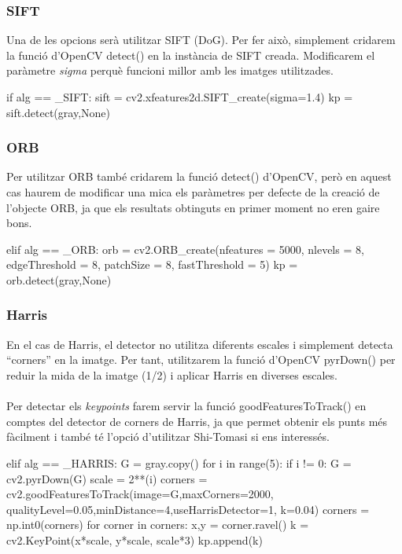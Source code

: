 		\subsubsection{SIFT}
		Una de les opcions serà utilitzar SIFT (DoG). Per fer això, simplement cridarem la funció d'OpenCV detect() en la instància de SIFT creada. Modificarem el paràmetre \textit{sigma} perquè funcioni millor
		amb les imatges utilitzades.\\
		\begin{python}
	if alg == _SIFT:
		sift = cv2.xfeatures2d.SIFT_create(sigma=1.4)
		kp = sift.detect(gray,None)
		\end{python}

		\subsubsection{ORB}
		Per utilitzar ORB també cridarem la funció detect() d'OpenCV, però en aquest cas haurem de modificar una mica els paràmetres per defecte de la creació de l'objecte ORB, ja que els resultats obtinguts
		en primer moment no eren gaire bons.\\
		\begin{python}
	elif alg == _ORB:
		orb = cv2.ORB_create(nfeatures = 5000, nlevels = 8, edgeThreshold = 8,
		 patchSize = 8, fastThreshold = 5)
		kp = orb.detect(gray,None)
		\end{python}
\newpage
		\subsubsection{Harris}
		En el cas de Harris, el detector no utilitza diferents escales i simplement detecta ``corners'' en la imatge. Per tant, utilitzarem la funció d'OpenCV pyrDown() per reduir
		la mida de la imatge (1/2) i aplicar Harris en diverses escales.\\\\
		Per detectar els \textit{keypoints} farem servir la funció goodFeaturesToTrack() en comptes del detector de corners de Harris, ja que permet obtenir els punts més fàcilment i
		també té l'opció d'utilitzar Shi-Tomasi si ens interessés.\\
		\begin{python}
	elif alg == _HARRIS:
		G = gray.copy()
		for i in range(5):
			if i != 0:
				G = cv2.pyrDown(G)
			scale = 2**(i)
			corners = cv2.goodFeaturesToTrack(image=G,maxCorners=2000,
				qualityLevel=0.05,minDistance=4,useHarrisDetector=1, k=0.04)
			corners = np.int0(corners)
			for corner in corners:
				x,y = corner.ravel()
				k = cv2.KeyPoint(x*scale, y*scale, scale*3)
				kp.append(k)
		\end{python}

